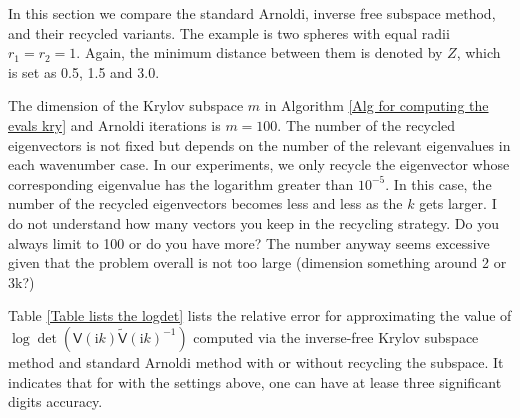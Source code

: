 In this section we compare the standard Arnoldi, inverse free subspace method, and their recycled variants. The example is 
two spheres with equal radii $r_{1} = r_{2} = 1$. Again, the minimum distance between them is denoted by $Z$, which is set as 0.5, 1.5 and 3.0. 

The dimension of the Krylov subspace $m$ in Algorithm \ref{Alg for computing the evals kry} and Arnoldi iterations
is $m = 100$. {\color{teal} The number of the recycled eigenvectors is not fixed but depends on the number of the relevant eigenvalues in each wavenumber case. 
In our experiments, we only recycle the eigenvector whose corresponding eigenvalue has the logarithm greater than $10^{-5}$. In this case, the number of the recycled
eigenvectors becomes less and less as the $k$ gets larger.} {\color{red} I do not understand how many vectors you keep in the recycling strategy. Do you always limit to 100 or do you have more?
The number anyway seems excessive given that the problem overall is not too large (dimension something around 2 or 3k?)}

Table \ref{Table lists the logdet} lists the relative error for approximating the value of $\log\det(\mathsf{V}(\mathrm{i}k)\tilde{\mathsf{V}}(\mathrm{i}k)^{-1})$ 
computed via the inverse-free Krylov subspace method and standard Arnoldi method with or without recycling the subspace. It indicates that for with the settings above, one 
can have at lease three significant digits accuracy.
 
